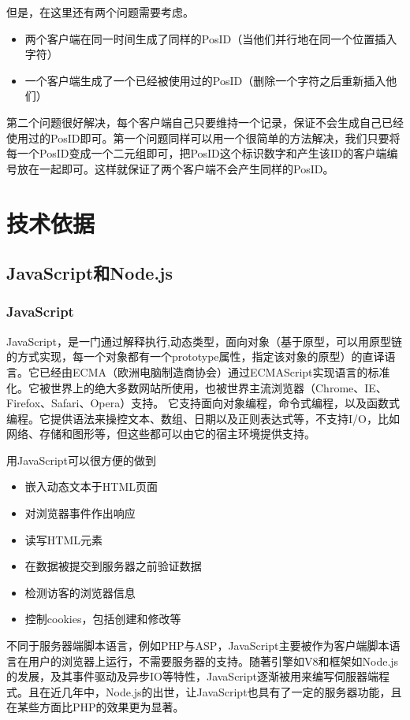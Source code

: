 \documentclass[11pt]{ctexart}
\begin{document}
但是，在这里还有两个问题需要考虑。
\begin{itemize}
	\item 两个客户端在同一时间生成了同样的PosID（当他们并行地在同一个位置插入字符）
	\item 一个客户端生成了一个已经被使用过的PosID（删除一个字符之后重新插入他们）
\end{itemize}

第二个问题很好解决，每个客户端自己只要维持一个记录，保证不会生成自己已经使用过的PosID即可。第一个问题同样可以用一个很简单的方法解决，我们只要将每一个PosID变成一个二元组即可，把PosID这个标识数字和产生该ID的客户端编号放在一起即可。这样就保证了两个客户端不会产生同样的PosID。

\section{技术依据}
\subsection{JavaScript和Node.js}
\subsubsection{JavaScript}
JavaScript，是一门通过解释执行,动态类型，面向对象（基于原型，可以用原型链的方式实现，每一个对象都有一个prototype属性，指定该对象的原型）的直译语言。它已经由ECMA（欧洲电脑制造商协会）通过ECMAScript实现语言的标准化。它被世界上的绝大多数网站所使用，也被世界主流浏览器（Chrome、IE、Firefox、Safari、Opera）支持。
它支持面向对象编程，命令式编程，以及函数式编程。它提供语法来操控文本、数组、日期以及正则表达式等，不支持I/O，比如网络、存储和图形等，但这些都可以由它的宿主环境提供支持。

用JavaScript可以很方便的做到
\begin{itemize}
	\item 嵌入动态文本于HTML页面
	\item 对浏览器事件作出响应
	\item 读写HTML元素
	\item 在数据被提交到服务器之前验证数据
	\item 检测访客的浏览器信息
	\item 控制cookies，包括创建和修改等
\end{itemize}

不同于服务器端脚本语言，例如PHP与ASP，JavaScript主要被作为客户端脚本语言在用户的浏览器上运行，不需要服务器的支持。随著引擎如V8和框架如Node.js的发展，及其事件驱动及异步IO等特性，JavaScript逐渐被用来编写伺服器端程式。且在近几年中，Node.js的出世，让JavaScript也具有了一定的服务器功能，且在某些方面比PHP的效果更为显著。
\end{document}
